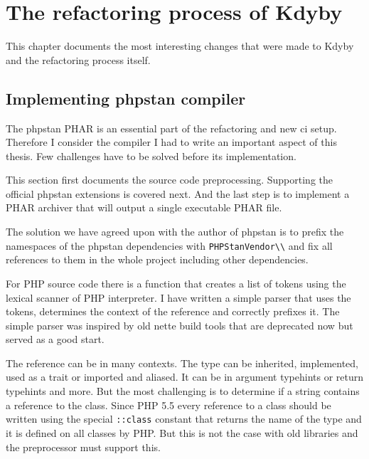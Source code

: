 \chapter{The refactoring process of Kdyby}

This chapter documents the most interesting changes that were made to Kdyby and the refactoring process itself.

\section{Implementing \gls{phpstan} compiler}

The \gls{phpstan} PHAR is an essential part of the refactoring and new \gls{ci} setup. Therefore I consider the compiler I had to write an important aspect of this thesis. Few challenges have to be solved before its implementation.

This section first documents the source code preprocessing. Supporting the official \gls{phpstan} extensions is covered next. And the last step is to implement a PHAR archiver that will output a single executable PHAR file.

 \label{sec:refactoring:phpstan-preprocessor}

The solution we have agreed upon with the author of \gls{phpstan} is to prefix the namespaces of the \gls{phpstan} dependencies with \lstinline{PHPStanVendor\\} and fix all references to them in the whole project including other dependencies.

For PHP source code there is a function  that creates a list of tokens using the lexical scanner of PHP interpreter. I have written a simple parser that uses the tokens, determines the context of the reference and correctly prefixes it. The simple parser was inspired by old \gls{nette} build tools that are deprecated now but served as a good start.

The reference can be in many contexts. The type can be inherited, implemented, used as a trait or imported and aliased. It can be in argument typehints or return typehints and more. But the most challenging is to determine if a string contains a reference to the class. Since PHP 5.5 every reference to a class should be written using the special \lstinline{::class} constant that returns the name of the type and it is defined on all classes by PHP. But this is not the case with old libraries and the preprocessor must support this.

